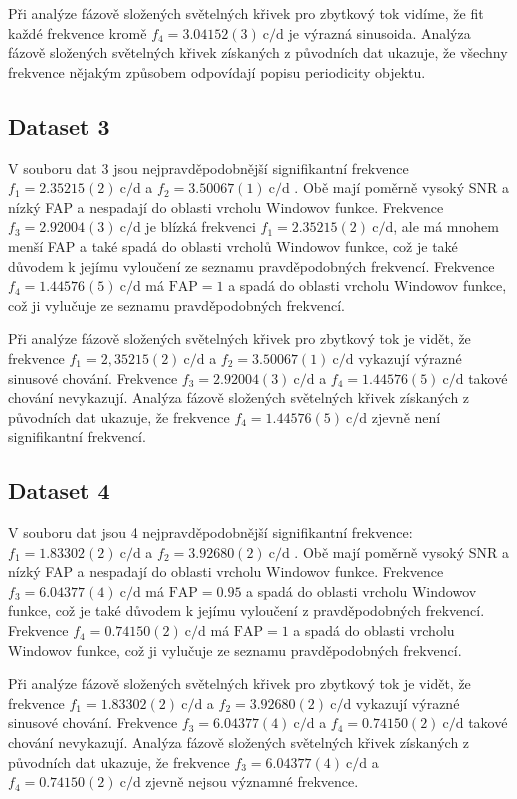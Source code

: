 \documentclass[a4paper,11pt,twocolumn]{article}
\begin{document}
            Při analýze fázově složených světelných křivek pro zbytkový tok vidíme, že fit každé frekvence kromě $f_4 = 3.04152(3) ~\text{c/d}$ je výrazná sinusoida. Analýza fázově složených světelných křivek získaných z původních dat ukazuje, že všechny frekvence nějakým způsobem odpovídají popisu periodicity objektu.

        \subsection{Dataset 3}
            V souboru dat 3 jsou nejpravděpodobnější signifikantní frekvence $f_1 = 2.35215(2) ~\text{c/d}$ a $f_2 = 3.50067(1) ~\text{c/d}$ . Obě mají poměrně vysoký SNR a nízký FAP a nespadají do oblasti vrcholu Windowov funkce. 
            Frekvence $f_3 = 2.92004(3) ~\text{c/d}$ je blízká frekvenci $f_1 = 2.35215(2) ~\text{c/d}$, ale má mnohem menší FAP a také spadá do oblasti vrcholů Windowov funkce, což je také důvodem k jejímu vyloučení ze seznamu pravděpodobných frekvencí. Frekvence $f_4 = 1.44576(5) ~\text{c/d}$ má $\text{FAP} = 1$ a spadá do oblasti vrcholu Windowov funkce, což ji vylučuje ze seznamu pravděpodobných frekvencí.
                
            Při analýze fázově složených světelných křivek pro zbytkový tok je vidět, že frekvence $f_1 = 2,35215(2) ~\text{c/d}$ a $f_2 = 3.50067(1) ~\text{c/d}$ vykazují výrazné sinusové chování. Frekvence $f_3 = 2.92004(3) ~\text{c/d}$ a $f_4 = 1.44576(5) ~\text{c/d}$ takové chování nevykazují. Analýza fázově složených světelných křivek získaných z původních dat ukazuje, že frekvence $f_4 = 1.44576(5) ~\text{c/d}$ zjevně není signifikantní frekvencí.

        \subsection{Dataset 4}
            V souboru dat jsou 4 nejpravděpodobnější signifikantní frekvence: $f_1 = 1.83302(2) ~\text{c/d}$ a $f_2 = 3.92680(2) ~\text{c/d}$ . Obě mají poměrně vysoký SNR a nízký FAP a nespadají do oblasti vrcholu Windowov funkce. Frekvence $f_3 = 6.04377(4) ~\text{c/d}$ má $\text{FAP} = 0.95$ a spadá do oblasti vrcholu Windowov funkce, což je také důvodem k jejímu vyloučení z pravděpodobných frekvencí. Frekvence $f_4 = 0.74150(2) ~\text{c/d}$ má $\text{FAP} = 1$ a spadá do oblasti vrcholu Windowov funkce, což ji vylučuje ze seznamu pravděpodobných frekvencí. 
                
            Při analýze fázově složených světelných křivek pro zbytkový tok je vidět, že frekvence $f_1 = 1.83302(2) ~\text{c/d}$ a $f_2 = 3.92680(2) ~\text{c/d}$ vykazují výrazné sinusové chování. Frekvence $f_3 = 6.04377(4) ~\text{c/d}$ a $f_4 = 0.74150(2) ~\text{c/d}$ takové chování nevykazují. Analýza fázově složených světelných křivek získaných z původních dat ukazuje, že frekvence $f_3 = 6.04377(4) ~\text{c/d}$ a $f_4 = 0.74150(2) ~\text{c/d}$ zjevně nejsou významné frekvence.
\end{document}
